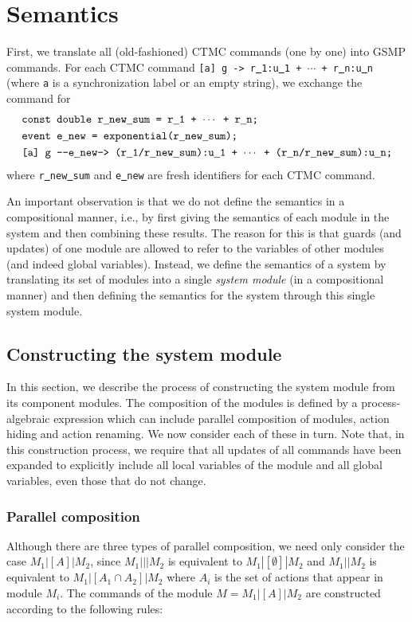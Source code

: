 \documentclass{article}
\renewcommand{\_}{\underline{~}}
\newcommand{\code}[1]{\texttt{#1}}
\begin{document}
\section*{Semantics}

First, we translate all (old-fashioned) CTMC commands (one by one) into GSMP commands.
For each CTMC command \code{[a] g -> r\_1:u\_1 + $\cdots$ + r\_n:u\_n} (where \code{a} is a synchronization label or an empty string), we exchange the command for
\begin{align*}
    &\code{const double r\_new\_sum = r\_1 + $\cdots$ + r\_n;} \\
	&\code{event e\_new } \code{= exponential(r\_new\_sum);} \\
	&\code{[a] g } \code{{-}{-}e\_new-> (r\_1/r\_new\_sum):u\_1 + $\cdots$ + (r\_n/r\_new\_sum):u\_n;} 
\end{align*}
where \code{r\_new\_sum} and \code{e\_new} are fresh identifiers for each CTMC command.

An important observation is that we do not define the semantics in a compositional manner, i.e., by first giving the semantics of each module in the system and then combining these results. 
The reason for this is that guards (and updates) of one module are allowed to refer to the variables of other modules (and indeed global variables). 
Instead, we define the semantics of a system by translating its set of modules into a single \emph{system module} (in a compositional manner) and then defining the semantics for the system through this single system module.


\subsection*{Constructing the system module}
In this section, we describe the process of constructing the system module from its component modules. 
The composition of the modules is defined by a process-algebraic expression which can include parallel composition of modules, action hiding and action renaming. 
We now consider each of these in turn. Note that, in this construction process, we require that all updates of all commands have been expanded to explicitly include all local variables of the module and all global variables, even those that do not change.


\subsubsection*{Parallel composition}
Although there are three types of parallel composition, we need only consider the case
$M_1|[A]|M_2$, since $M_1|||M_2$ is equivalent to $M_1|[\emptyset]|M_2$ and $M_1||M_2$ is equivalent to $M_1|[A_1 \cap A_2]|M_2$ where $A_i$ is the set of actions that appear in module $M_i$. 
The commands of the module $M = M_1|[A]|M_2$ are constructed according to the following rules:
\end{document}
